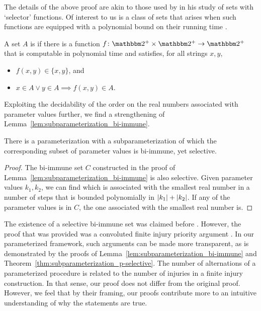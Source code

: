 The details of the above proof are akin to those used by \textcite{jockusch1968semirecursive} in his study of sets with `selector' functions.
Of interest to us is a class of sets that arises when such functions are equipped with a polynomial bound on their running time  \parencite{selman1979p-selective}.
\begin{definition}
  A set $A$ is  if there is a function $f\colon \binary^+ \times \binary^+ \to \binary^+$ that is computable in polynomial time and satisfies, for all strings $x, y$,
  \begin{itemize}
  \item $f(x, y) \in \{x, y\}$, and
  \item $x \in A \lor y \in A \implies f(x, y) \in A$.
  \end{itemize}
\end{definition}

Exploiting the decidability of the order on the real numbers associated with parameter values further, we find a strengthening of Lemma~\ref{lem:subparameterization_bi-immune}.
\begin{theorem}
\label{thm:subparameterization_p-selective}%
  There is a parameterization with a subparameterization of which the corresponding subset of parameter values is bi-immune, yet \pdash{}selective.
\end{theorem}
\begin{proof}
  The bi-immune set $C$ constructed in the proof of Lemma~\ref{lem:subparameterization_bi-immune} is also \pdash{}selective.
  Given parameter values $k_1, k_2$, we can find which is associated with the smallest real number in a number of steps that is bounded polynomially in ${\lvert k_1\rvert} + {\lvert k_2\rvert}$.
  If any of the parameter values is in $C$, the one associated with the smallest real number is.
\end{proof}

The existence of a \pdash{}selective bi-immune set was claimed before \parencite{goldsmith1993note}.
However, the proof that was provided was a convoluted finite injury priority argument \parencite[see also][Section~2.11]{downey2010algorithmic}.
In our parameterized framework, such arguments can be made more transparent, as is demonstrated by the proofs of Lemma~\ref{lem:subparameterization_bi-immune} and Theorem~\ref{thm:subparameterization_p-selective}.
The number of alternations of a parameterized procedure is related to the number of injuries in a finite injury construction.
In that sense, our proof does not differ from the original proof.
However, we feel that by their framing, our proofs contribute more to an intuitive understanding of why the statements are true.
